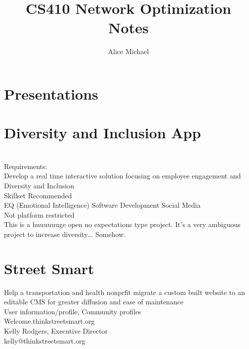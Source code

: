 \chead{}
\author{Alice Michael}
\title{CS410 Network Optimization Notes}
\date{}






\section*{Presentations}

\section*{Diversity and Inclusion App}\\
Requirements:\\
\indent Develop a real time interactive solution focusing on employee engagement and Diversity and Inclusion\\

Skillset Recommended\\
\indent EQ (Emotional Intelligence) Software Development Social Media\\

\indent Not platform restricted\\

\indent This is a huuuuuuge open no expectations type project.  It's a very ambiguous project to increase diversity... Somehow.\\

\section*{Street Smart}
\indent Help a transportation and health nonprfit migrate a custom built website to an editable CMS for greater diffusion and ease of maintenance\\

\indent User information/profile, Community profiles\\
Welcome.thinkstreetsmart.org\\
Kelly Rodgers, Executive Director\\
kelly@thinkstreetsmart.org\\

